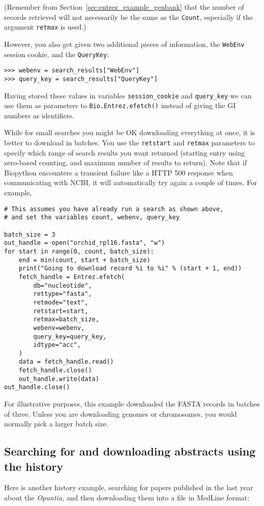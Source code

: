 \noindent (Remember from Section~\ref{sec:entrez_example_genbank} that the number of records retrieved will not necessarily be the same as the \verb+Count+, especially if the argument \verb+retmax+ is used.)

\noindent However, you also get given two additional pieces of information, the \texttt{WebEnv} session cookie, and the \texttt{QueryKey}:

\begin{verbatim}
>>> webenv = search_results["WebEnv"]
>>> query_key = search_results["QueryKey"]
\end{verbatim}

Having stored these values in variables \texttt{session\_cookie} and \texttt{query\_key} we can use them as parameters to \verb|Bio.Entrez.efetch()| instead of giving the GI numbers as identifiers.

While for small searches you might be OK downloading everything at once, it is better to download in batches.  You use the \texttt{retstart} and \texttt{retmax} parameters to specify which range of search results you want returned (starting entry using zero-based counting, and maximum number of results to return). Note that if Biopython encounters a transient failure like a HTTP 500 response when communicating with NCBI, it will automatically try again a couple of times.
For example,

\begin{verbatim}
# This assumes you have already run a search as shown above,
# and set the variables count, webenv, query_key

batch_size = 3
out_handle = open("orchid_rpl16.fasta", "w")
for start in range(0, count, batch_size):
    end = min(count, start + batch_size)
    print("Going to download record %i to %i" % (start + 1, end))
    fetch_handle = Entrez.efetch(
        db="nucleotide",
        rettype="fasta",
        retmode="text",
        retstart=start,
        retmax=batch_size,
        webenv=webenv,
        query_key=query_key,
        idtype="acc",
    )
    data = fetch_handle.read()
    fetch_handle.close()
    out_handle.write(data)
out_handle.close()
\end{verbatim}

\noindent For illustrative purposes, this example downloaded the FASTA records in batches of three.  Unless you are downloading genomes or chromosomes, you would normally pick a larger batch size.

\subsection{Searching for and downloading abstracts using the history}
Here is another history example, searching for papers published in the last year about the \textit{Opuntia}, and then downloading them into a file in MedLine format:

